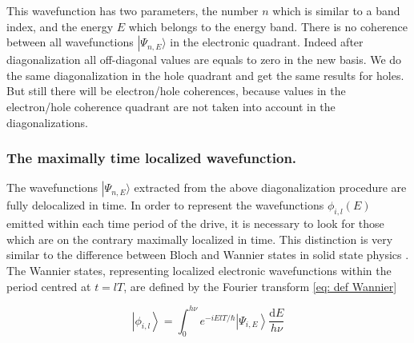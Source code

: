 This wavefunction has two parameters, the number $n$  which is similar to a band index, and the energy $E$ which belongs to the energy band.
There is no coherence between all wavefunctions $\left|\Psi_{n,E}\rangle$ in the electronic quadrant.
Indeed after diagonalization all off-diagonal values are equals to zero in the new basis.
We do the same diagonalization in the hole quadrant and get the same results for holes.
But still there will be electron/hole coherences, because values in the electron/hole coherence quadrant are not taken into account in the diagonalizations.

\subsubsection*{The maximally time localized wavefunction.} 

The wavefunctions  $\left|\Psi_{n,E}\rangle$ extracted from the above diagonalization procedure are fully delocalized in time.
In order to represent the wavefunctions $\phi_{i,l}\left(E\right)$ emitted within each time period of the drive, it is necessary to look for those which are on the contrary maximally localized in time.
This distinction is very similar to the difference between Bloch and Wannier states in solid state physics \cite{marzari2012maximally}.
The Wannier states, representing localized electronic wavefunctions within the period centred at $t=lT$, are defined by the Fourier transform \eqref{eq: def Wannier}

\begin{equation}
\left|\phi_{i,l}\right> = \int_0^{h\nu}  e^{-iElT/\hbar} \left|\Psi_{i,E}\right>\dfrac{\mathrm{d}E}{h\nu}  \label{eq: def Wannier}
\end{equation}


